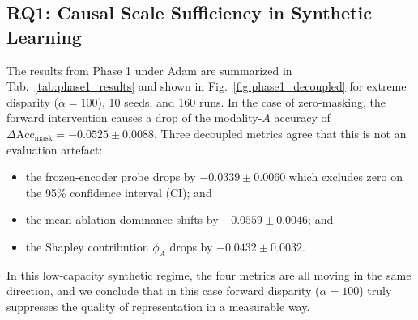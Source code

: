 \documentclass[conference]{IEEEtran}
\begin{document}
\subsection{RQ1: Causal Scale Sufficiency in Synthetic Learning}
The results from Phase 1 under Adam are summarized in Tab.~\ref{tab:phase1_results} and shown in Fig.~\ref{fig:phase1_decoupled} for extreme disparity ($\alpha = 100$), 10 seeds, and 160 runs. In the case of zero-masking, the forward intervention causes a drop of the modality-$A$ accuracy of $\Delta \text{Acc}_{\text{mask}} = -0.0525 \pm 0.0088$. Three decoupled metrics agree that this is not an evaluation artefact:
\begin{itemize}
    \item the frozen-encoder probe drops by $-0.0339 \pm 0.0060$ which excludes zero on the 95\% confidence interval (CI); and
    \item the mean-ablation dominance shifts by $-0.0559 \pm 0.0046$; and
    \item the Shapley contribution $\phi_A$ drops by $-0.0432 \pm 0.0032$.
\end{itemize}
In this low-capacity synthetic regime, the four metrics are all moving in the same direction, and we conclude that in this case forward disparity ($\alpha = 100$) truly suppresses the quality of representation in a measurable way.


\begin{table}[!t]
\centering
\caption{Phase 1 Decoupled Results: Forward Intervention vs.\ Baseline (Adam, $\alpha = 100$, 10 seeds, 160 runs); paired Student-$t$ 95\% CIs}
\label{tab:phase1_results}
\renewcommand{\arraystretch}{1.1}
\end{table}
\end{document}
